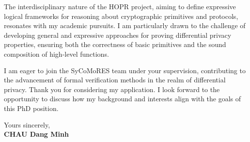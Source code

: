 \documentclass[11pt]{report}
\begin{document}
\begin{titlepage}
    \vspace{0.7em}

    The interdisciplinary nature of the HOPR project, aiming to define expressive logical frameworks for reasoning about cryptographic primitives and protocols, resonates with my academic pursuits. I am particularly drawn to the challenge of developing general and expressive approaches for proving differential privacy properties, ensuring both the correctness of basic primitives and the sound composition of high-level functions.

    \vspace{0.7em}

    I am eager to join the SyCoMoRES team under your supervision, contributing to the advancement of formal verification methods in the realm of differential privacy. Thank you for considering my application. I look forward to the opportunity to discuss how my background and interests align with the goals of this PhD position.

    \vspace{0.7em}

    Yours sincerely,\\
    \textbf{CHAU Dang Minh}

\end{titlepage}
\end{document}
